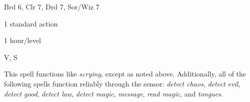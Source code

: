 
\begin{description*}
\item[Level:] Brd 6, Clr 7, Drd 7, Sor/Wiz 7
\item[Casting Time:] 1 standard action
\item[Duration:] 1 hour/level
\item[Components:] V, S
\end{description*}

This spell functions like \textit{scrying}, except as noted above. Additionally,
all of the following spells function reliably through the sensor: \textit{detect
chaos}, \textit{detect evil}, \textit{detect good}, \textit{detect law}, \textit{detect
magic}, \textit{message}, \textit{read magic}, and \textit{tongues}.